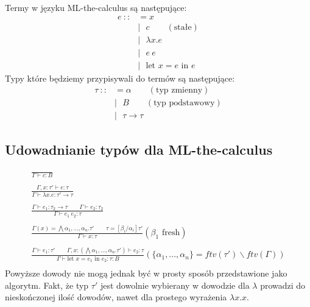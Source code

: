 \documentclass{article}
\begin{document}
Termy w języku ML-the-calculus są następujące:
\begin{equation}
  \begin{split}
    e\ ::&=x\\
    &|\ \ \ c\qquad(\text{stałe})\\
    &|\ \ \ \lambda x.e\\
    &|\ \ \ e\ e\\
    &|\ \ \ \text{let }x=e\text{ in }e
  \end{split}
\end{equation}
Typy które będziemy przypisywali do termów są następujące:
\begin{equation}
  \begin{split}
    \tau\ ::&=\alpha\qquad(\text{typ zmienny})\\
    &|\ \ \ B\qquad(\text{typ podstawowy})\\
    &|\ \ \ \tau\rightarrow\tau
  \end{split}
\end{equation}
\subsection{Udowadnianie typów dla ML-the-calculus}

\begin{equation}
  \begin{split}
    \frac{}{\Gamma\vdash c:B} \\
    \\
    \frac{\Gamma,x:\tau'\vdash e:\tau}{\Gamma\vdash\lambda x.e:\tau'\rightarrow\tau} \\
    \\
    \frac{\Gamma\vdash e_1:\tau_2\rightarrow\tau\qquad\Gamma\vdash e_2:\tau_2}{\Gamma\vdash e_1\ e_2:\tau} \\
    \\
    \frac{\Gamma(x)=\bigwedge\alpha_1,...,\alpha_n.\tau'\qquad\tau=[\beta_i/\alpha_i]\tau'}{\Gamma\vdash x:\tau}(\beta_1\text{ fresh}) \\
    \\
    \frac{\Gamma\vdash e_1:\tau'\qquad\Gamma,x:(\bigwedge\alpha_1,...,\alpha_n.\tau')\vdash e_2:\tau}{\Gamma\vdash \text{let }x=e_1\text{ in }e_2:\tau:B}(\{\alpha_1,...,\alpha_n\}=ftv(\tau')\backslash ftv(\Gamma)) \\
  \end{split}
\end{equation}
Powyższe dowody nie mogą jednak być w prosty sposób przedstawione jako algorytm. Fakt, że typ $\tau'$ jest dowolnie wybierany w dowodzie dla $\lambda$ prowadzi do nieskończonej ilość dowodów, nawet dla prostego wyrażenia $\lambda x.x$.
\end{document}

